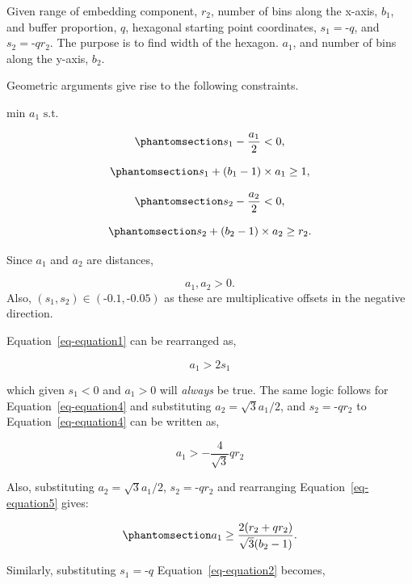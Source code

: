 \documentclass[
  12pt]{article}
\begin{document}
Given range of embedding component, \(r_2\), number of bins along the
x-axis, \(b_1\), and buffer proportion, \(q\), hexagonal starting point
coordinates, \(s_1 = \text{-}q\), and \(s_2 = \text{-}qr_2\). The
purpose is to find width of the hexagon. \(a_1\), and number of bins
along the y-axis, \(b_2\).

Geometric arguments give rise to the following constraints.

\(\text{min }a_1 \text{ s.t.}\)

\begin{equation}\phantomsection\label{eq-equation1}{
s_1 - \frac{a_1}{2} < 0,
}\end{equation}

\begin{equation}\phantomsection\label{eq-equation2}{
s_1 + (b_1 - 1) \times a_1 \geq 1,
}\end{equation}

\begin{equation}\phantomsection\label{eq-equation4}{
s_2 - \frac{a_2}{2} < 0,
}\end{equation}

\begin{equation}\phantomsection\label{eq-equation5}{
s_2 + (b_2 - 1) \times a_2 \geq r_2.
}\end{equation}

Since \(a_1\) and \(a_2\) are distances,

\[
a_1, a_2 > 0.
\] Also, \((s_1, s_2) \in (\text{-}0.1, \text{-}0.05)\) as these are
multiplicative offsets in the negative direction.

Equation~\ref{eq-equation1} can be rearranged as,

\[
a_1 > 2s_1
\]

which given \(s_1 < 0\) and \(a_1 > 0\) will \emph{always} be true. The
same logic follows for Equation~\ref{eq-equation4} and substituting
\(a_2 = \sqrt{3}a_1/{2}\), and \(s_2 = \text{-}qr_2\) to
Equation~\ref{eq-equation4} can be written as,

\[
a_1 > -\frac{4}{\sqrt{3}}qr_2
\]

Also, substituting \(a_2 = \sqrt{3}a_1/{2}\), \(s_2 = \text{-}qr_2\) and
rearranging Equation~\ref{eq-equation5} gives:

\begin{equation}\phantomsection\label{eq-equation6}{
a_1 \geq \frac{2(r_2 + qr_2)}{\sqrt{3}(b_2 - 1)}.
}\end{equation}

Similarly, substituting \(s_1 = \text{-}q\) Equation~\ref{eq-equation2}
becomes,
\end{document}
